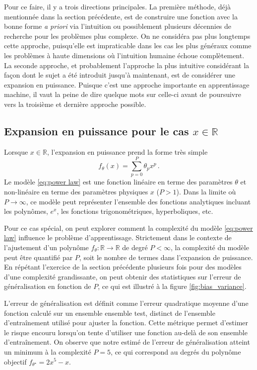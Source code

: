 Pour ce faire, il y a trois directions principales. La première méthode, déjà mentionnée dans la section précédente, est de construire une fonction avec la bonne forme \textit{a priori} via l'intuition 
ou possiblement plusieurs décennies de recherche pour les problèmes plus complexe. 
On ne considéra pas plus longtemps cette approche, puisqu'elle est impraticable dans les cas les plus généraux comme les problèmes à haute dimensions où l'intuition humaine échoue complètement.
La seconde approche, et probablement l'approche la plus intuitive considérant la façon dont le sujet a été introduit jusqu'à maintenant, est de considérer une expansion en puissance.
Puisque c'est une approche importante en apprentissage machine, il vaut la peine de dire quelque mots sur celle-ci avant de poursuivre vers la troisième 
et dernière approche possible. 

\subsection{Expansion en puissance pour le cas $x \in \mathbb{R}$}
Lorsque $x \in \mathbb{R}$, l'expansion en puissance prend la forme très simple
\begin{equation}\label{eq:power law}
        f_\theta(x) = \sum_{p = 0}^{P} \theta_p x^{p}\, .
\end{equation} 
Le modèle \eqref{eq:power law} est une fonction linéaire en terme des paramètres $\theta$ et non-linéaire en terme des paramètres physiques $x$ ($P > 1$). Dans la limite où $P \rightarrow \infty$, ce modèle 
peut représenter l'ensemble des fonctions analytiques incluant les polynômes, $e^x$, les fonctions trigonométriques, hyperboliques, etc. 

Pour ce cas spécial, on peut explorer comment la complexité du modèle \eqref{eq:power law} influence le problème d'apprentissage. Strictement dans le contexte de l'ajustement 
d'un polynôme $f_\theta: \mathbb{R} \rightarrow \mathbb{R}$ de degré $P < \infty$, la complexité du modèle peut être quantifié par $P$, soit le nombre de termes dans 
l'expansion de puissance. En répétant l'exercice de la section précédente plusieurs fois pour des modèles d'une complexité grandissante,
on peut obtenir des statistiques sur l'erreur de généralisation en fonction de $P$, ce qui est illustré à la figure \ref{fig:bias_variance}.

L'erreur de généralisation est définit comme l'erreur quadratique moyenne d'une fonction calculé sur un ensemble ensemble test, distinct de l'ensemble d'entraînement 
utilisé pour ajuster la fonction.
Cette métrique permet d'estimer le risque encouru lorsqu'on tente d'utiliser une fonction au-delà de son ensemble d'entraînement.
On observe que notre estimé de l'erreur de généralisation atteint un minimum à la complexité $P=5$, ce qui correspond au degrés du polynôme objectif $f_{\theta^{\star}} = 2x^5 - x$. 

